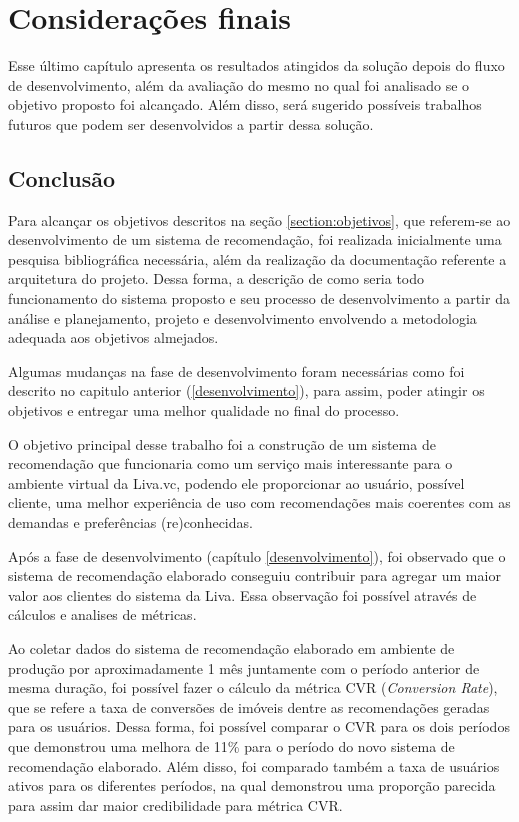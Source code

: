 \chapter{Considerações finais}

Esse último capítulo apresenta os resultados atingidos da solução depois do fluxo de desenvolvimento, além da avaliação do mesmo no qual foi analisado se o objetivo proposto foi alcançado. Além disso, será sugerido possíveis trabalhos futuros que podem ser desenvolvidos a partir dessa solução.

\section{Conclusão}

Para alcançar os objetivos descritos na seção \ref{section:objetivos}, que referem-se ao desenvolvimento de um sistema de recomendação, foi realizada inicialmente uma pesquisa bibliográfica necessária, além da realização da documentação referente a arquitetura do projeto. Dessa forma, a descrição de como seria todo funcionamento do sistema proposto e seu processo de desenvolvimento a partir da análise e planejamento, projeto e desenvolvimento envolvendo a metodologia adequada aos objetivos almejados.

Algumas mudanças na fase de desenvolvimento foram necessárias como foi descrito no capitulo anterior (\ref{desenvolvimento}), para assim, poder atingir os objetivos e entregar uma melhor qualidade no final do processo.

O objetivo principal desse trabalho foi a construção de um sistema de recomendação que funcionaria como um serviço mais interessante para o ambiente virtual da Liva.vc, podendo ele proporcionar ao usuário, possível cliente, uma melhor experiência de uso com recomendações mais coerentes com as demandas e preferências (re)conhecidas.

Após a fase de desenvolvimento (capítulo \ref{desenvolvimento}), foi observado que o sistema de recomendação elaborado conseguiu contribuir para agregar um maior valor aos clientes do sistema da Liva. Essa observação foi possível através de cálculos e analises de métricas.

Ao coletar dados do sistema de recomendação elaborado em ambiente de produção por aproximadamente 1 mês juntamente com o período anterior de mesma duração, foi possível fazer o cálculo da métrica CVR (\textit{Conversion Rate}), que se refere a taxa de conversões de imóveis dentre as recomendações geradas para os usuários. Dessa forma, foi possível comparar o CVR para os dois períodos que demonstrou uma melhora de 11\% para o período do novo sistema de recomendação elaborado. Além disso, foi comparado também a taxa de usuários ativos para os diferentes períodos, na qual demonstrou uma proporção parecida para assim dar maior credibilidade para métrica CVR.

